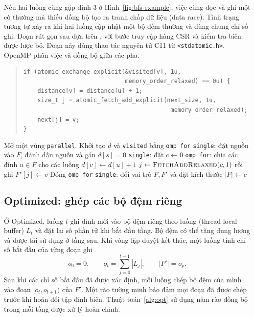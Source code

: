 Nếu hai luồng cùng gặp đỉnh $3$ ở Hình~\ref{fig:bfs-example}, việc cùng đọc và ghi một cờ thường mà thiếu đồng bộ tạo ra tranh chấp dữ liệu (data race). Tình trạng tương tự xảy ra khi hai luồng cập nhật một bộ đếm thường và dùng chung chỉ số ghi. Đoạn rút gọn sau dựa trên , với bước truy cập hàng CSR và kiểm tra biên được lược bỏ. Đoạn này dùng thao tác nguyên tử C11 từ \texttt{<stdatomic.h>}. OpenMP phân việc và đồng bộ giữa các pha.
\begin{quote}\small\singlespacing
\begin{verbatim}
if (atomic_exchange_explicit(&visited[v], 1u,
                             memory_order_relaxed) == 0u) {
    distance[v] = distance[u] + 1;
    size_t j = atomic_fetch_add_explicit(next_size, 1u,
                                          memory_order_relaxed);
    next[j] = v;
}
\end{verbatim}
\end{quote}

\begin{algorithm}[htbp]
\caption{BFS OpenMP với bộ đếm chung (Basic)}
\label{alg:basic}
\begin{algorithmic}[1]
\State Mở một vùng \texttt{parallel}. Khởi tạo $d$ và \texttt{visited} bằng \texttt{omp for}
\State \texttt{single}: đặt nguồn vào $F$, đánh dấu nguồn và gán $d[s]=0$
  \State \texttt{single}: đặt $c\gets0$ 
  \State \texttt{omp for}: chia các đỉnh $u\in F$ cho các luồng
      \State $d[v]\gets d[u]+1$
      \State $j\gets\Call{FetchAddRelaxed}{c,1}$ rồi ghi $F'[j]\gets v$
    \EndIf
  \EndFor
  \State Đóng \texttt{omp for} 
  \State \texttt{single}: đổi vai trò $F,F'$ và đặt kích thước $|F|\gets c$ 
\EndWhile
\end{algorithmic}
\end{algorithm}

\subsection{Optimized: ghép các bộ đệm riêng}
Ở Optimized, luồng $t$ ghi đỉnh mới vào bộ đệm riêng theo luồng (thread-local buffer) $L_t$ và đặt lại số phần tử khi bắt đầu tầng. Bộ đệm có thể tăng dung lượng và được tái sử dụng ở tầng sau. Khi vòng lặp duyệt kết thúc, một luồng tính chỉ số bắt đầu của từng đoạn ghi
\[
 o_0=0,\qquad o_t=\sum_{j=0}^{t-1}|L_j|,\qquad |F'|=o_p.
\]
Sau khi các chỉ số bắt đầu đã được xác định, mỗi luồng chép bộ đệm của mình vào đoạn $[o_t,o_{t+1})$ của $F'$. Một rào tường minh bảo đảm mọi đoạn đã được chép trước khi hoán đổi tập đỉnh biên. Thuật toán~\ref{alg:opt} sử dụng năm rào đồng bộ trong mỗi tầng được xử lý hoàn chỉnh.

